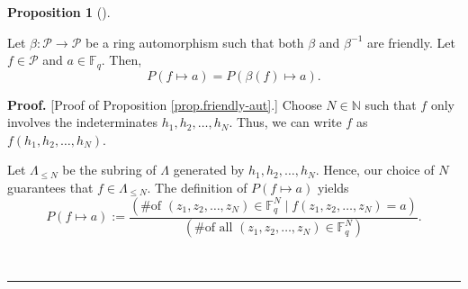 \documentclass[numbers=enddot,12pt,final,onecolumn,notitlepage]{scrartcl}%
\theoremstyle{definition}
\newtheorem{prop}[theo]{Proposition}
\newenvironment{proposition}[1][]
{\begin{prop}[#1]\begin{leftbar}}
{\end{leftbar}\end{prop}}
\newenvironment{proof}[1][Proof]{\noindent\textbf{#1.} }{\ \rule{0.5em}{0.5em}}
\renewcommand{\leq}{\leqslant}
\theoremstyle{plainsl}
\begin{document}
\begin{proposition}
\label{prop.friendly-aut}Let $\beta:\mathcal{P}\rightarrow\mathcal{P}$ be a
ring automorphism such that both $\beta$ and $\beta^{-1}$ are friendly. Let
$f\in\mathcal{P}$ and $a\in\mathbb{F}_{q}$. Then,%
\[
P\left(  f\mapsto a\right)  =P\left(  \beta\left(  f\right)  \mapsto a\right)
.
\]

\end{proposition}

\begin{proof}
[Proof of Proposition \ref{prop.friendly-aut}.] Choose $N\in\mathbb{N}$ such
that $f$ only involves the indeterminates $h_{1},h_{2},\ldots,h_{N}$. Thus, we
can write $f$ as $f\left(  h_{1},h_{2},\ldots,h_{N}\right)  $.

Let $\Lambda_{\leq N}$ be the subring of $\Lambda$ generated by $h_{1}%
,h_{2},\ldots,h_{N}$. Hence, our choice of $N$ guarantees that $f\in
\Lambda_{\leq N}$. The definition of $P\left(  f\mapsto a\right)  $ yields%
\begin{equation}
P\left(  f\mapsto a\right)  :=\dfrac{\left(  \text{\# of }\left(  z_{1}%
,z_{2},\ldots,z_{N}\right)  \in\mathbb{F}_{q}^{N}\mid f\left(  z_{1}%
,z_{2},\ldots,z_{N}\right)  =a\right)  }{\left(  \text{\# of all }\left(
z_{1},z_{2},\ldots,z_{N}\right)  \in\mathbb{F}_{q}^{N}\right)  }%
.\label{pf.prop.friendly-aut.P1}%
\end{equation}



\end{proof}
\end{document}
